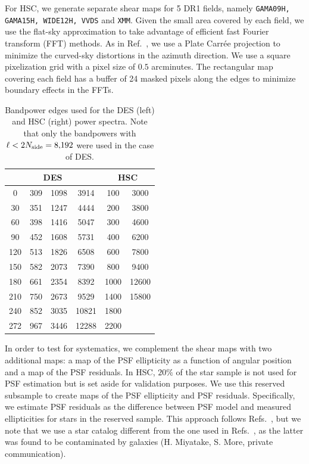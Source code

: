 \documentclass[a4paper,11pt]{article}
\newcommand{\Nside}{N_{\rm side}}
\begin{document}
      For HSC, we generate separate shear maps for 5 DR1 fields, namely \texttt{GAMA09H, GAMA15H, WIDE12H, VVDS} and \texttt{XMM}. Given the small area covered by each field, we use the flat-sky approximation to take advantage of efficient fast Fourier transform (FFT) methods. As in Ref.~\cite{1912.08209}, we use a Plate Carr\'ee projection to minimize the curved-sky distortions in the azimuth direction. We use a square pixelization grid with a pixel size of $0.5$ arcminutes. The rectangular map covering each field has a buffer of 24 masked pixels along the edges to minimize boundary effects in the FFTs. 
      \begin{table}
        \centering
        \begin{tabular}{|cccc||cc|}
          \hline
          \multicolumn{4}{|c||}{DES} & \multicolumn{2}{c|}{HSC} \\
          \hline
          0 & 309 & 1098 & 3914 & 100 & 3000\\
          30 & 351 & 1247 & 4444 & 200 & 3800 \\
          60 & 398 & 1416 & 5047 & 300 & 4600\\
          90 & 452 & 1608 & 5731 & 400 & 6200\\
          120 & 513 & 1826 & 6508 & 600 & 7800\\
          150 & 582 & 2073 & 7390 & 800 & 9400\\
          180 & 661 & 2354 & 8392 & 1000 & 12600\\
          210 & 750 & 2673 & 9529 & 1400 & 15800\\
          240 & 852 & 3035 & 10821 & 1800 & \\
          272 & 967 & 3446 & 12288 & 2200 & \\
          \hline
        \end{tabular}
        \caption{Bandpower edges used for the DES (left) and HSC (right) power spectra. Note that only the bandpowers with $\ell<2\Nside=8{,}192$ were used in the case of DES.}\label{tab:bpws}
      \end{table}

      In order to test for systematics, we complement the shear maps with two additional maps: a map of the PSF ellipticity as a function of angular position and a map of the PSF residuals. In HSC, $20\%$ of the star sample is not used for PSF estimation but is set aside for validation purposes. We use this reserved subsample to create  maps of the PSF ellipticity and PSF residuals. Specifically, we estimate PSF residuals as the difference between PSF model and measured ellipticities for stars in the reserved sample. This approach follows Refs.~\cite{1705.06745, 1809.09148}, but we note that we use a star catalog different from the one used in Refs.~\cite{1705.06745, 1809.09148}, as the latter was found to be contaminated by galaxies (H. Miyatake, S. More, private communication).
\end{document}
